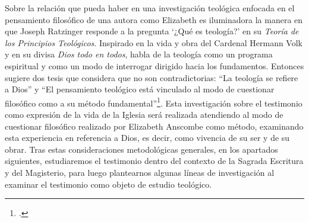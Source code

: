 Sobre la relación que pueda haber en una investigación teológica enfocada en el pensamiento filosófico de una autora como Elizabeth es iluminadora la manera en que Joseph Ratzinger responde a la pregunta \enquote*{¿Qué es teología?} en su \emph{Teoría de los Principios Teológicos}. Inspirado en la vida y obra del Cardenal Hermann Volk y en su divisa \emph{Dios todo en todos}, habla de la teología como un programa espiritual y como un modo de interrogar dirigido hacia los fundamentos. Entonces sugiere dos tesis que considera que no son contradictorias: \enquote{La teología se refiere a Dios} y  \enquote{El pensamiento teológico está vinculado al modo de cuestionar filosófico como a su método fundamental}\footnote{\Cite[Cf.][380]{ratzinger2005teoria}.
}.
Esta investigación sobre el testimonio como expresión de la vida de la Iglesia será realizada atendiendo al modo de cuestionar filosófico realizado por Elizabeth Anscombe como método, examinando esta experiencia en referencia a Dios, es decir, como vivencia de su ser y de su obrar. Tras estas consideraciones metodológicas generales, en los apartados siguientes, estudiaremos el testimonio dentro del contexto de la Sagrada Escritura y del Magisterio, para luego plantearnos algunas líneas de investigación al examinar el testimonio como objeto de estudio teológico.

